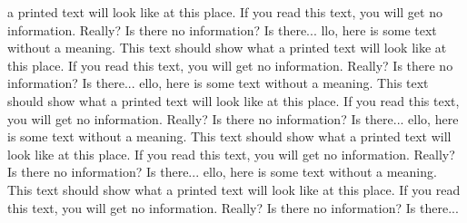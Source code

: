 \documentclass{article}
\begin{document}
\begin{multicols}{3}
 a printed text will look like at this place.
 If you read this text, you will get no information.  Really?  Is there 
 no information?  Is there...
llo, here is some text without a meaning.  This text should show what 
 a printed text will look like at this place.
 If you read this text, you will get no information.  Really?  Is there 
 no information?  Is there...
ello, here is some text without a meaning.  This text should show what 
 a printed text will look like at this place.
 If you read this text, you will get no information.  Really?  Is there 
 no information?  Is there...
ello, here is some text without a meaning.  This text should show what 
 a printed text will look like at this place.
 If you read this text, you will get no information.  Really?  Is there 
 no information?  Is there...
ello, here is some text without a meaning.  This text should show what 
 a printed text will look like at this place.
 If you read this text, you will get no information.  Really?  Is there 
 no information?  Is there...

 \end{multicols}
\end{document}
